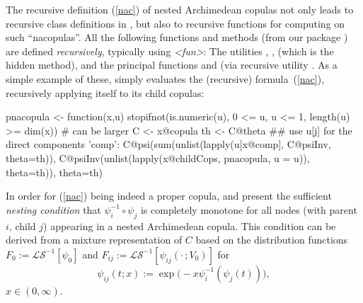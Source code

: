 \documentclass[nojss,article]{jss}
\theoremstyle{mythmstyle}
\newcommand*{\R}{\proglang{R}}%
\newcommand*{\psiis}[1]{{\psi_{#1}^{-1}}}
\newcommand*{\LS}{\mathcal{LS}}
\newcommand*{\LSi}{\LS^{-1}}
\begin{document}
The recursive definition (\ref{nac}) of nested Archimedean copulas not only leads to
recursive class definitions in \R, but also to recursive functions for
computing on such ``nacopulas''.
All the following functions and methods (from our package )
are defined \emph{recursively}, typically using
 \textit{<fun>}\code{)}:
The utilities , ,  (which is the hidden
 method), and the principal functions
 and  (via recursive utility .
As a simple example of these,  simply evaluates the
(recursive) formula~(\ref{nac}), recursively applying itself to its child copulas:
\begin{Schunk}
\begin{Sinput}
pnacopula <- function(x,u) {
    stopifnot(is.numeric(u), 0 <= u, u <= 1, length(u) >= dim(x)) # can be larger
    C <- x@copula
    th <- C@theta
    ## use u[j] for the direct components 'comp':
    C@psi(sum(unlist(lapply(u[x@comp], C@psiInv, theta=th)),
              C@psiInv(unlist(lapply(x@childCops, pnacopula, u = u)),
                       theta=th)),
          theta=th)
}
\end{Sinput}
\end{Schunk}


In order for (\ref{nac}) being indeed a proper copula,
\citet[p.\ 88]{joe1997} and \citet{mcneil2008} present the sufficient
\textit{nesting condition} that $\psiis{i}\circ\psi_{j}$ is completely
monotone for all nodes (with parent $i$, child $j$) appearing in a nested
Archimedean copula.
This condition can be derived from a mixture representation of $C$ based on
the distribution functions $F_0:=\LSi[\psi_0]$ and
$F_{ij}:=\LSi[\psi_{ij}(\cdot\,;V_0)]$ for
\begin{equation*}
  \psi_{ij}(t;x):=\exp\bigl(-x\psiis{i}(\psi_{j}(t))\bigr),
\end{equation*}
$x\in(0,\infty)$.
\end{document}
